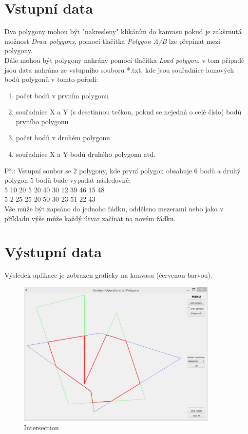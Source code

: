 \documentclass[a4paper, 12pt]{article}
\begin{document}
\clearpage

\section{Vstupní data}

Dva polygony mohou být "nakresleny" klikáním do kanvasu pokud je zakšrnutá možnost \textit{Draw polygons}, pomocí tlačítka \textit{Polygon A/B} lze přepínat mezi polygony.\\

\noindent Dále mohou být polygony nahrány pomocí tlačítka \textit{Load polygon}, v tom případě jsou data nahrána ze vstupního souboru *.txt, kde jsou souřadnice lomových bodů polygonů v tomto pořadí:
\begin{enumerate}
\item	počet bodů v prvním polygonu 
\item	 souřadnice X a Y (s desetinnou tečkou, pokud se nejedná o celé číslo) bodů prvního polygonu
\item	 počet bodů v druhém polygonu
\item souřadnice X a Y bodů druhého polygonu atd.
\end{enumerate}

Př.: Vstupní soubor se 2 polygony, kde první polygon obsahuje 6 bodů a druhý polygon 5 bodů bude vypadat následovně:\\
 
 5 10 20 5 20 40 30 12 39 46 15 48\\
5 2 25 25 20 50 30 23 51 22 43\\

Vše může být zapsáno do jednoho řádku, odděleno mezerami nebo jako v příkladu výše může každý útvar začínat na novém řádku.\\

\section{Výstupní data}
Výsledek aplikace je zobrazen graficky na kanvasu (červenou barvou).

\begin{figure}[h]
	\centering
	\includegraphics[width=10cm]{inter.jpg}
	\caption{Intersection}
\end{figure}
\clearpage
\end{document}
